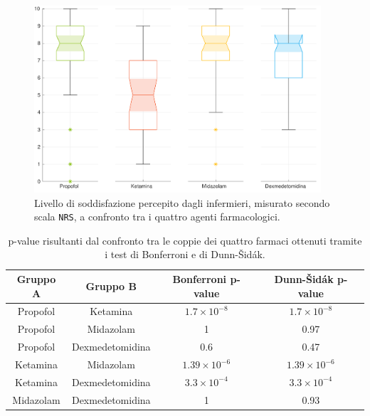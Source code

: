 \begin{figure}[h]
    \centering
    \includegraphics[width=0.95\textwidth]{Figure/qualita-colorful.pdf}
    \caption{Livello di soddisfazione percepito dagli infermieri, misurato secondo scala \texttt{NRS}, a confronto tra i quattro agenti farmacologici.}
    \label{fig:qualitascolorful}
\end{figure}

\bgroup
\def\arraystretch{1.5}
\begin{table}[h]
    \centering
    \begin{tabular}{c|c|c|c}
         Gruppo A & Gruppo B & Bonferroni p-value & Dunn-Šidák p-value\\ \hline
       Propofol & Ketamina & $1.7\times10^{-8}$ & $1.7\times10^{-8}$ \\
       Propofol & Midazolam  & 1 & 0.97\\
       Propofol & Dexmedetomidina & 0.6 & 0.47\\
       Ketamina & Midazolam & $1.39\times10^{-6}$ & $1.39\times10^{-6}$\\
       Ketamina & Dexmedetomidina & $3.3\times10^{-4}$ & $3.3\times10^{-4}$\\
       Midazolam & Dexmedetomidina & 1 & 0.93\\
       
    \end{tabular}
    \caption{p-value risultanti dal confronto tra le coppie dei quattro farmaci ottenuti tramite i test di Bonferroni e di Dunn-Šidák.}
    \label{tab:qualitatest}
\end{table}
\egroup

